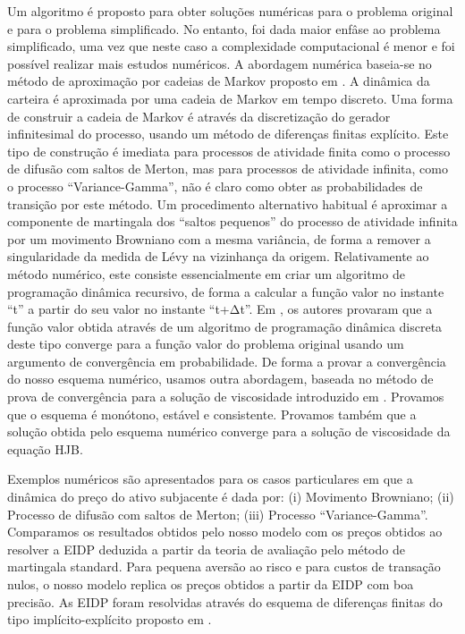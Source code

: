 Um algoritmo é proposto para obter soluções numéricas para o problema original e para o problema simplificado. 
No entanto, foi dada maior enfâse ao problema simplificado, uma vez que neste caso a complexidade computacional é menor e foi possível realizar mais estudos numéricos. 
A abordagem numérica baseia-se no método de aproximação por cadeias de Markov proposto em \cite{Kushner}. 
A dinâmica da carteira é aproximada por uma cadeia de Markov em tempo discreto. 
Uma forma de construir a cadeia de Markov é através da discretização do gerador infinitesimal do processo, usando um método de diferenças finitas explícito. 
Este tipo de construção é imediata para processos de atividade finita como o processo de difusão com saltos de Merton, mas para processos de atividade infinita, 
como o processo “Variance-Gamma”, não é claro como obter as probabilidades de transição por este método. 
Um procedimento alternativo habitual é aproximar a componente de martingala dos “saltos pequenos” do processo de atividade infinita por um movimento Browniano com a mesma variância, 
de forma a remover a singularidade da medida de Lévy na vizinhança da origem. 
Relativamente ao método numérico, este consiste essencialmente em criar um algoritmo de programação dinâmica recursivo, 
de forma a calcular a função valor no instante “t” a partir do seu valor no instante “t+Δt”. 
Em \cite{Kushner}, os autores provaram que a função valor obtida através de um algoritmo de programação dinâmica discreta deste tipo converge para a função valor do problema 
original usando um argumento de convergência em probabilidade. 
De forma a provar a convergência do nosso esquema numérico, usamos outra abordagem, baseada no método de prova de convergência para a solução de viscosidade introduzido 
em \cite{BaSo91}. 
Provamos que o esquema é monótono, estável e consistente. Provamos também que a solução obtida pelo esquema numérico converge para a solução de viscosidade da equação HJB. 

Exemplos numéricos são apresentados para os casos particulares em que a dinâmica do preço do ativo subjacente é dada por: 
(i) Movimento Browniano; (ii) Processo de difusão com saltos de Merton; (iii) Processo “Variance-Gamma”.  
Comparamos os resultados obtidos pelo nosso modelo com os preços obtidos ao resolver a EIDP deduzida a partir da teoria de avaliação pelo método de martingala standard. 
Para pequena aversão ao risco e para custos de transação nulos, o nosso modelo replica os preços obtidos a partir da EIDP com boa precisão.  
As EIDP foram resolvidas através do esquema de diferenças finitas do tipo implícito-explícito proposto em \cite{CoVo05b}. 

